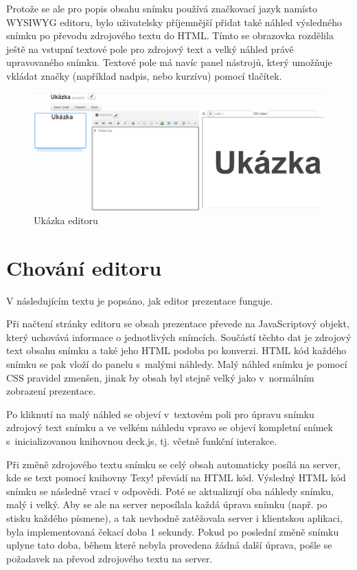\documentclass[11pt,twoside,a4paper]{book}
\begin{document}
Protože se ale pro popis obsahu snímku používá značkovací jazyk namísto WYSIWYG editoru, bylo uživatelsky příjemnější přidat také náhled výsledného snímku po převodu zdrojového textu do HTML. Tímto se obrazovka rozdělila ještě na vstupní textové pole pro zdrojový text a velký náhled právě upravovaného snímku. Textové pole má navíc panel nástrojů, který umožňuje vkládat značky (například nadpis, nebo kurzívu) pomocí tlačítek.

\begin{figure}[ht]
	\begin{center}
		\includegraphics[width=14cm]{PRO-img/editor2.png}
		\caption{Ukázka editoru}
		\label{fig:editorLayout}
	\end{center}
\end{figure}


\section{Chování editoru}
V následujícím textu je popsáno, jak editor prezentace funguje.

Při načtení stránky editoru se obsah prezentace převede na JavaScriptový objekt, který uchovává informace o jednotlivých snímcích. Součástí těchto dat je zdrojový text obsahu snímku a také jeho HTML podoba po konverzi. HTML kód každého snímku se pak vloží do panelu s~malými náhledy. Malý náhled snímku je pomocí CSS pravidel zmenšen, jinak by obsah byl stejně velký jako v~normálním zobrazení prezentace.

Po kliknutí na malý náhled se objeví v~textovém poli pro úpravu snímku zdrojový text snímku a ve velkém náhledu vpravo se objeví kompletní snímek s~inicializovanou knihovnou deck.js, tj. včetně funkční interakce.

Při změně zdrojového textu snímku se celý obsah automaticky posílá na server, kde se text pomocí knihovny Texy! převádí na HTML kód. Výsledný HTML kód snímku se následně vrací v odpovědi. Poté se aktualizují oba náhledy snímku, malý i velký. Aby se ale na server neposílala každá úprava snímku (např. po stisku každého písmene), a tak nevhodně zatěžovala server i klientskou aplikaci, byla implementovaná čekací doba 1 sekundy. Pokud po poslední změně snímku uplyne tato doba, během které nebyla provedena žádná další úprava, pošle se požadavek na převod zdrojového textu na server.
\end{document}
